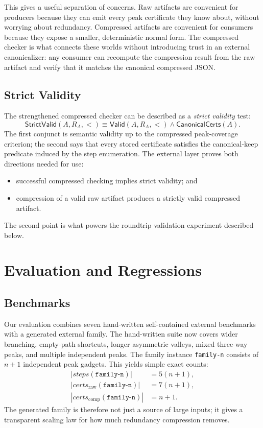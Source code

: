 \documentclass[submission,copyright,creativecommons]{eptcs}
\newcommand{\steps}{\textit{steps}}
\newcommand{\certs}{\textit{certs}}
\newcommand{\family}[1]{\texttt{family-#1}}
\begin{document}
This gives a useful separation of concerns. Raw artifacts are convenient for
producers because they can emit every peak certificate they know about, without
worrying about redundancy. Compressed artifacts are convenient for consumers
because they expose a smaller, deterministic normal form. The compressed checker
is what connects these worlds without introducing trust in an external
canonicalizer: any consumer can recompute the compression result from the raw
artifact and verify that it matches the canonical compressed JSON.

\subsection{Strict Validity}

The strengthened compressed checker can be described as a \emph{strict validity}
test:
\[
  \textsf{StrictValid}(A,R_A,<) \equiv
  \textsf{Valid}(A,R_A,<) \wedge \textsf{CanonicalCerts}(A).
\]
The first conjunct is semantic validity up to the compressed peak-coverage
criterion; the second says that every stored certificate satisfies the
canonical-keep predicate induced by the step enumeration. The external layer
proves both directions needed for use:
\begin{itemize}
\item successful compressed checking implies strict validity; and
\item compression of a valid raw artifact produces a strictly valid compressed
  artifact.
\end{itemize}
The second point is what powers the roundtrip validation experiment described
below.

\section{Evaluation and Regressions}

\subsection{Benchmarks}

Our evaluation combines seven hand-written self-contained external benchmarks
with a generated external family. The hand-written suite now covers wider
branching, empty-path shortcuts, longer asymmetric valleys, mixed three-way
peaks, and multiple independent peaks. The family instance \family{n}
consists of $n+1$ independent peak gadgets. This yields simple exact counts:
\[
\begin{aligned}
  |\steps(\family{n})| &= 5(n+1), \\
  |\certs_{\mathrm{raw}}(\family{n})| &= 7(n+1), \\
  |\certs_{\mathrm{comp}}(\family{n})| &= n+1.
\end{aligned}
\]
The generated family is therefore not just a source of large inputs; it gives a
transparent scaling law for how much redundancy compression removes.
\end{document}

